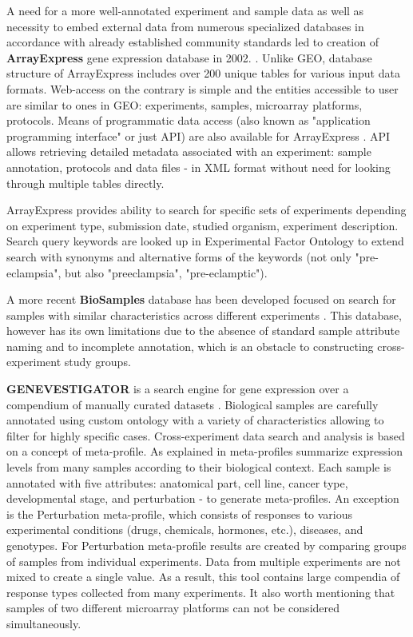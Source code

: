 \documentclass[conference]{IEEEtran}
\begin{document}
A need for a more well-annotated experiment and sample data as well as necessity to embed external data from numerous specialized databases in accordance with already established community standards led to creation of \textbf{ArrayExpress} gene expression database in 2002. \cite{Sarkans2005ThePerspective}. Unlike GEO, database structure of ArrayExpress includes over 200 unique tables for various input data formats. Web-access on the contrary is simple and the entities accessible to user are similar to ones in GEO: experiments, samples, microarray platforms, protocols. Means of programmatic data access (also known as "application programming interface" or just API) are also available for ArrayExpress \cite{Programm69:online}. API allows retrieving detailed metadata associated with an experiment: sample annotation, protocols and data files - in XML format without need for looking through multiple tables directly.

ArrayExpress provides ability to search for specific sets of experiments depending on experiment type, submission date, studied organism, experiment description. Search query keywords are looked up in Experimental Factor Ontology to extend search with synonyms and alternative forms of the keywords (not only "pre-eclampsia", but also "preeclampsia", "pre-eclamptic"). 

A more recent \textbf{BioSamples} database has been developed focused on search for samples with similar characteristics across different experiments \cite{wwwebiac40:online}. This database, however has its own limitations due to the absence of standard sample attribute naming and to incomplete annotation, which is an obstacle to constructing cross-experiment study groups.

\textbf{GENEVESTIGATOR} is a search engine for gene expression over a compendium of manually curated datasets \cite{Hruz2008GenevestigatorTranscriptomes,ZimmermannGENEVESTIGATOR.1w,genevestigatorsite}. 
Biological samples are carefully annotated using custom ontology with a variety of characteristics allowing to filter for highly specific cases. Cross-experiment data search and analysis is based on a concept of meta-profile. As explained in \cite{Clauzel2016} meta-profiles summarize expression levels from many samples according to their biological context. Each sample is annotated with five attributes: anatomical part, cell line, cancer type, developmental stage, and perturbation - to generate meta-profiles. An exception is the Perturbation meta-profile, which consists of responses to various experimental conditions (drugs, chemicals, hormones, etc.), diseases, and genotypes. For Perturbation meta-profile results are created by comparing groups of samples from individual experiments. Data from multiple experiments are not mixed to create a single value. As a result, this tool contains large compendia of response types collected from many experiments. It also worth mentioning that samples of two different microarray platforms can not be considered simultaneously.
\end{document}
